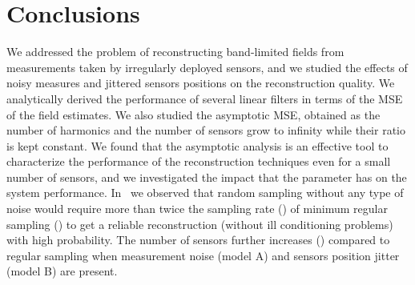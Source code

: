 \documentclass[final, a4paper]{IEEEtran}
\begin{document}
\section{Conclusions\label{sec:conclusions}}
We addressed the problem of reconstructing band-limited fields from
measurements taken by irregularly deployed sensors, and we studied
the effects of noisy measures and jittered sensors positions on the reconstruction quality.
We analytically derived
the performance of several linear filters in terms of
the MSE of the field estimates. We also studied
the asymptotic MSE, obtained as the number of harmonics and the number of
sensors grow to infinity while their ratio  is kept constant.
We found that the asymptotic analysis is an effective tool to characterize the
performance of the reconstruction techniques
even for a small number of sensors, and we investigated the impact
that the parameter  has on the system performance.
In~\cite{NordioChiasseriniViterbo} we observed that random sampling without any type of noise
would require more than twice the sampling rate () of minimum regular sampling ()
to get a reliable reconstruction (without ill conditioning problems) with high probability.
The number of sensors further increases () compared to regular sampling when measurement
noise (model A) and sensors position jitter (model B) are present.
\end{document}
